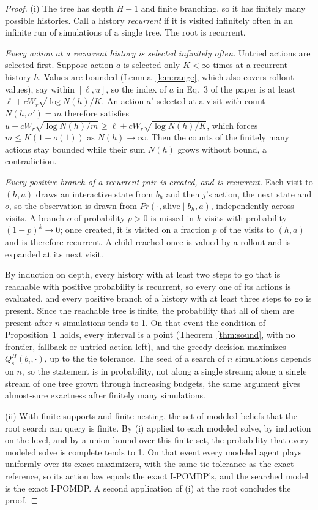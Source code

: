 \documentclass{article}
\renewcommand{\Pr}{\mathit{Pr}}
\begin{document}
\begin{proof}
(i) The tree has depth $H - 1$ and finite branching, so it has finitely many possible histories. Call a history \emph{recurrent} if it is visited infinitely often in an infinite run of simulations of a single tree. The root is recurrent.

\emph{Every action at a recurrent history is selected infinitely often.} Untried actions are selected first. Suppose action $a$ is selected only $K < \infty$ times at a recurrent history $h$. Values are bounded (Lemma~\ref{lem:range}, which also covers rollout values), say within $[\ell, u]$, so the index of $a$ in Eq.~3 of the paper is at least $\ell + c W_r \sqrt{\log N(h) / K}$. An action $a'$ selected at a visit with count $N(h, a') = m$ therefore satisfies $u + c W_r \sqrt{\log N(h)/m} \geq \ell + c W_r \sqrt{\log N(h)/K}$, which forces $m \leq K (1 + o(1))$ as $N(h) \to \infty$. Then the counts of the finitely many actions stay bounded while their sum $N(h)$ grows without bound, a contradiction.

\emph{Every positive branch of a recurrent pair is created, and is recurrent.} Each visit to $(h, a)$ draws an interactive state from $b_h$ and then $j$'s action, the next state and $o$, so the observation is drawn from $\Pr(\cdot, \mathrm{alive} \mid b_h, a)$, independently across visits. A branch $o$ of probability $p > 0$ is missed in $k$ visits with probability $(1 - p)^k \to 0$; once created, it is visited on a fraction $p$ of the visits to $(h, a)$ and is therefore recurrent. A child reached once is valued by a rollout and is expanded at its next visit.

By induction on depth, every history with at least two steps to go that is reachable with positive probability is recurrent, so every one of its actions is evaluated, and every positive branch of a history with at least three steps to go is present. Since the reachable tree is finite, the probability that all of them are present after $n$ simulations tends to 1. On that event the condition of Proposition~1 holds, every interval is a point (Theorem~\ref{thm:sound}, with no frontier, fallback or untried action left), and the greedy decision maximizes $Q^H_{\mathrm{s}}(b_i, \cdot)$, up to the tie tolerance. The seed of a search of $n$ simulations depends on $n$, so the statement is in probability, not along a single stream; along a single stream of one tree grown through increasing budgets, the same argument gives almost-sure exactness after finitely many simulations.

(ii) With finite supports and finite nesting, the set of modeled beliefs that the root search can query is finite. By (i) applied to each modeled solve, by induction on the level, and by a union bound over this finite set, the probability that every modeled solve is complete tends to 1. On that event every modeled agent plays uniformly over its exact maximizers, with the same tie tolerance as the exact reference, so its action law equals the exact I-POMDP's, and the searched model is the exact I-POMDP. A second application of (i) at the root concludes the proof.
\end{proof}
\end{document}
